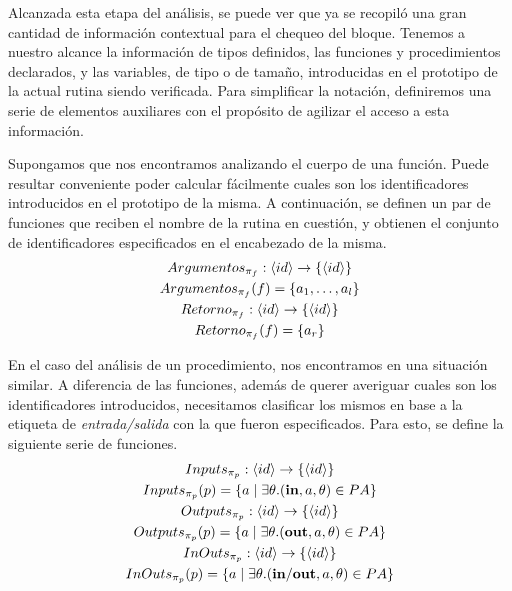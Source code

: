 \documentclass{article}
\begin{document}
Alcanzada esta etapa del análisis, se puede ver que ya se recopiló una gran cantidad de información contextual para el chequeo del bloque.
Tenemos a nuestro alcance la información de tipos definidos, las funciones y procedimientos declarados, y las variables, de tipo o de tamaño, introducidas en el prototipo de la actual rutina siendo verificada.
Para simplificar la notación, definiremos una serie de elementos auxiliares con el propósito de agilizar el acceso a esta información.

Supongamos que nos encontramos analizando el cuerpo de una función.
Puede resultar conveniente poder calcular fácilmente cuales son los identificadores introducidos en el prototipo de la misma.
A continuación, se definen un par de funciones que reciben el nombre de la rutina en cuestión, y obtienen el conjunto de identificadores especificados en el encabezado de la misma.
\begin{gather*}
Argumentos_{\pi_{f}}: \langle id \rangle \rightarrow \{ \langle id \rangle \}
\\
Argumentos_{\pi_{f}}(f) = \{ a_1, \ldots, a_l \}
\\
Retorno_{\pi_{f}}: \langle id \rangle \rightarrow \{ \langle id \rangle \}
\\
Retorno_{\pi_{f}}(f) = \{ a_r \}
\end{gather*}

En el caso del análisis de un procedimiento, nos encontramos en una situación similar.
A diferencia de las funciones, además de querer averiguar cuales son los identificadores introducidos, necesitamos clasificar los mismos en base a la etiqueta de \textit{entrada/salida} con la que fueron especificados.
Para esto, se define la siguiente serie de funciones.
\begin{gather*}
Inputs_{\pi_{p}}: \langle id \rangle \rightarrow \{ \langle id \rangle \}
\\
Inputs_{\pi_{p}}(p) = \{ a \mid \exists \theta. (\mathbf{in}, a, \theta) \in PA \}
\\
Outputs_{\pi_{p}}: \langle id \rangle \rightarrow \{ \langle id \rangle \}
\\
Outputs_{\pi_{p}}(p) = \{ a \mid \exists \theta. (\mathbf{out}, a, \theta) \in PA \}
\\
InOuts_{\pi_{p}}: \langle id \rangle \rightarrow \{ \langle id \rangle \}
\\
InOuts_{\pi_{p}}(p) = \{ a \mid \exists \theta. (\mathbf{in/out}, a, \theta) \in PA \}
\end{gather*}
\end{document}
